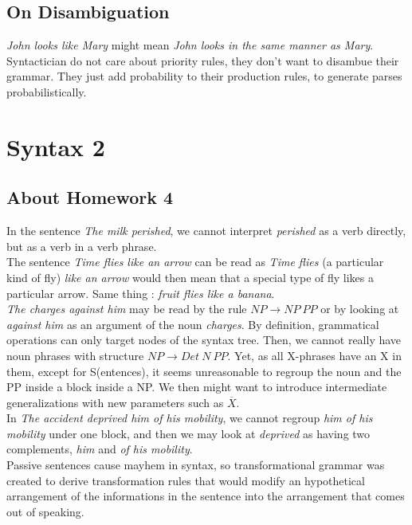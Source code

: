 \documentclass{cours}
\begin{document}
\subsection{On Disambiguation}
\textsl{John looks like Mary} might mean \textsl{John looks in the same manner as Mary}. Syntactician do not care about priority rules, they don't want to disambue their grammar. They just add probability to their production rules, to generate parses probabilistically. 

\section[Cours 5\! : 26/10]{Syntax 2}
\subsection{About Homework 4}
In the sentence \textsl{The milk perished}, we cannot interpret \textsl{perished} as a verb directly, but as a verb in a verb phrase.\\
The sentence \textsl{Time flies like an arrow} can be read as \textsl{Time flies} (a particular kind of fly) \textsl{like an arrow} would then mean that a special type of fly likes a particular arrow. Same thing\! : \textsl{fruit flies like a banana}.\\
\textsl{The charges against him} may be read by the rule $NP \rightarrow NP \ PP$ or by looking at \textsl{against him} as an argument of the noun \textsl{charges}. 
By definition, grammatical operations can only target nodes of the syntax tree. Then, we cannot really have noun phrases with structure $NP \rightarrow Det\ N\ PP$. Yet, as all X-phrases have an X in them, except for S(entences), it seems unreasonable to regroup the noun and the PP inside a block inside a NP. We then might want to introduce intermediate generalizations with new parameters such as $\overline{X}$.\\
In \textsl{The accident deprived him of his mobility}, we cannot regroup \textsl{him of his mobility} under one block, and then we may look at \textsl{deprived} as having two complements, \textsl{him} and \textsl{of his mobility}.\\
Passive sentences cause mayhem in syntax, so transformational grammar was created to derive transformation rules that would modify an hypothetical arrangement of the informations in the sentence into the arrangement that comes out of speaking. 
\end{document}
